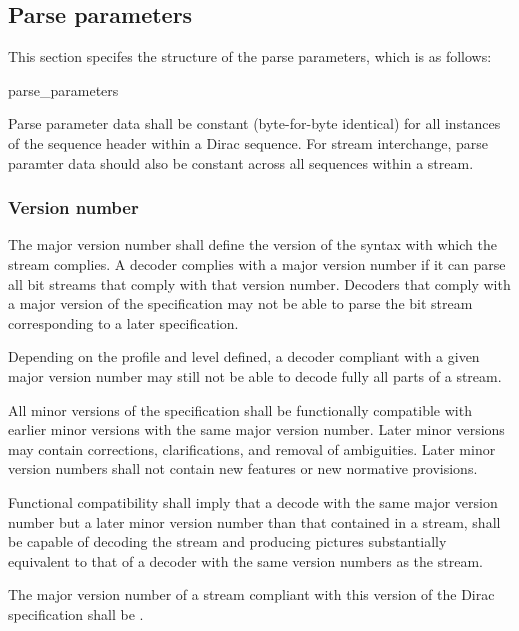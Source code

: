 \subsection{Parse parameters}
\label{parseparameters}

This section specifes the structure of the parse parameters, which is as follows:

\begin{pseudo}{parse\_parameters}{}
\end{pseudo}

Parse parameter data shall be constant (byte-for-byte identical) for all instances 
of the sequence header within a Dirac sequence. For stream interchange, parse
paramter data should also be constant across all sequences within a stream.

\subsubsection{Version number}

The major version number shall define the version of the syntax with 
which the stream complies. A decoder complies with a major version 
number if it can parse all bit streams that comply with 
that version number. Decoders that comply with a major version of 
the specification may not be able to parse the bit stream corresponding 
to a later specification.

Depending on the profile and level defined, a decoder compliant 
with a given major version number may still not be able to decode 
fully all parts of a stream.

All minor versions of the specification shall be functionally compatible 
with earlier minor versions with the same major version number. Later minor 
versions may contain corrections, clarifications, and removal of ambiguities. 
Later minor version numbers shall not contain new features or new 
normative provisions.

Functional compatibility shall imply that a decode with the same major version
number but a later minor version number than that contained in a stream, shall
be capable of decoding the stream and producing pictures substantially equivalent
to that of a decoder with the same version numbers as the stream.

The major version number of a stream compliant with this version 
of the Dirac specification shall be \MajorVersion.

